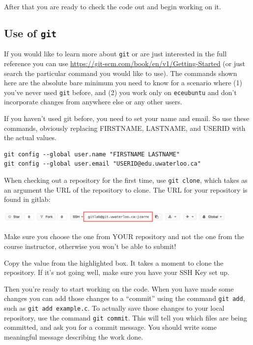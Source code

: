 After that you are ready to check the code out and begin working on it.


\subsection*{Use of \texttt{git}}
If you would like to learn more about \texttt{git} or are just interested in the full reference you can use \url{https://git-scm.com/book/en/v1/Getting-Started} (or just search the particular command you would like to use). The commands shown here are the absolute bare minimum you need to know for a scenario where (1) you've never used \texttt{git} before, and (2) you work only on \texttt{eceubuntu} and don't incorporate changes from anywhere else or any other users.

If you haven't used git before, you need to set your name and email. So use these commands, obviously replacing FIRSTNAME, LASTNAME, and USERID with the actual values.
\begin{lstlisting}
git config --global user.name "FIRSTNAME LASTNAME"
git config --global user.email "USERID@edu.uwaterloo.ca"
\end{lstlisting}

When checking out a repository for the first time, use \texttt{git clone}, which takes as an argument the URL of the repository to clone. The URL for your repository is found in gitlab:

\begin{center}
	\includegraphics[width=0.9\textwidth]{images/gitlab-clone.png}
\end{center}

Make sure you choose the one from YOUR repository and not the one from the course instructor, otherwise you won't be able to submit!

Copy the value from the highlighted box. It takes a moment to clone the repository. If it's not going well, make sure you have your SSH Key set up.

Then you're ready to start working on the code. When you have made some changes you can add those changes to a ``commit'' using the command \texttt{git add}, such as \texttt{git add example.c}. To actually save those changes to your local repository, use the command \texttt{git commit}. This will tell you which files are being committed, and ask you for a commit message. You should write some meaningful message describing the work done.


